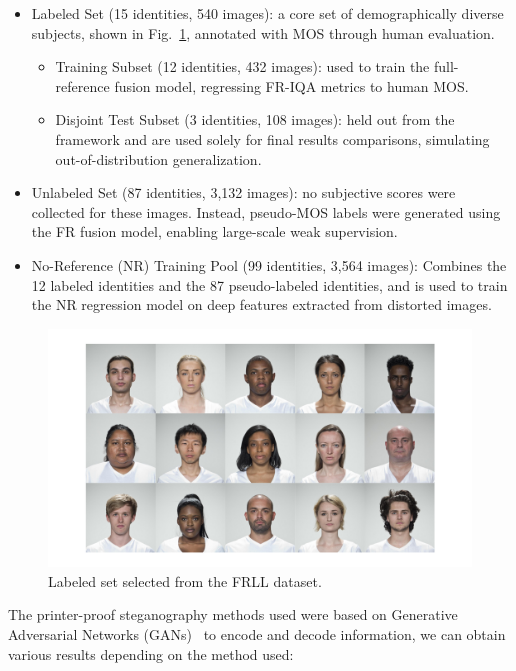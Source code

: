 \begin{itemize}
    \item Labeled Set (15 identities, 540 images): a core set of demographically diverse subjects, shown in Fig.~\ref{fig:subdataset}, annotated with MOS through human evaluation.
    \begin{itemize}
        \item Training Subset (12 identities, 432 images): used to train the full-reference fusion model, regressing FR-IQA metrics to human MOS.\@
        \item Disjoint Test Subset (3 identities, 108 images): held out from the framework and are used solely for final results comparisons, simulating out-of-distribution generalization.
    \end{itemize}
    \item Unlabeled Set (87 identities, 3,132 images): no subjective scores were collected for these images. Instead, pseudo-MOS labels were generated using the FR fusion model, enabling large-scale weak supervision.
    \item No-Reference (NR) Training Pool (99 identities, 3,564 images): Combines the 12 labeled identities and the 87 pseudo-labeled identities, and is used to train the NR regression model on deep features extracted from distorted images.
\end{itemize}

\begin{figure}
    \centering
    \includegraphics[width=1\linewidth]{images/subdataset.png}
    \caption{Labeled set selected from the FRLL dataset.}\label{fig:subdataset}
\end{figure}

The printer-proof steganography methods used were based on Generative Adversarial Networks (GANs)~\cite{gans2018} to encode and decode information, we can obtain various results depending on the method used:

